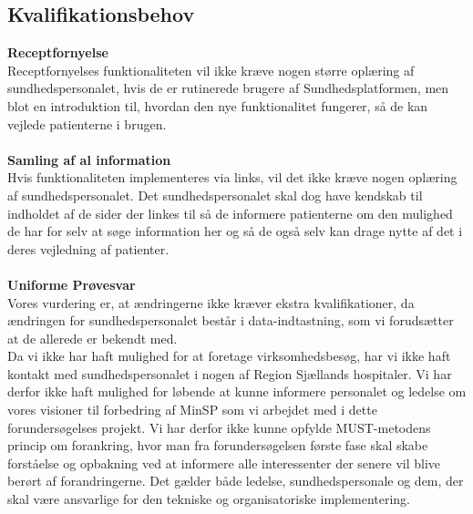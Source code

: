 \subsection{Kvalifikationsbehov}
\textbf{Receptfornyelse} \\
Receptfornyelses funktionaliteten vil ikke kræve nogen større oplæring af sundhedspersonalet, hvis de er rutinerede brugere af Sundhedsplatformen, men blot en introduktion til, hvordan den nye funktionalitet fungerer, så de kan vejlede patienterne i brugen.
\\\\
\textbf{Samling af al information} \\
Hvis funktionaliteten implementeres via links, vil det ikke kræve nogen oplæring af sundhedspersonalet. Det sundhedspersonalet skal dog have kendskab til indholdet af de sider der linkes til så de informere patienterne om den mulighed de har for selv at søge information her og så de også selv kan drage nytte af det i deres vejledning af patienter.
\\\\
\textbf{Uniforme Prøvesvar} \\
Vores vurdering er, at ændringerne ikke kræver ekstra kvalifikationer, da ændringen for sundhedspersonalet består i data-indtastning, som vi forudsætter at de allerede er bekendt med.\\
Da vi ikke har haft mulighed for at foretage virksomhedsbesøg, har vi ikke haft kontakt med sundhedspersonalet i nogen af Region Sjællands hospitaler. Vi har derfor ikke haft mulighed for løbende at kunne informere personalet og ledelse om vores visioner til forbedring af MinSP som vi arbejdet med i dette forundersøgelses projekt. Vi har derfor ikke kunne opfylde MUST-metodens princip om forankring, hvor man fra forundersøgelsen første fase skal skabe forståelse og opbakning ved at informere alle interessenter der senere vil blive berørt af forandringerne. Det gælder både ledelse, sundhedspersonale og dem, der skal være ansvarlige for den tekniske og organisatoriske implementering.
